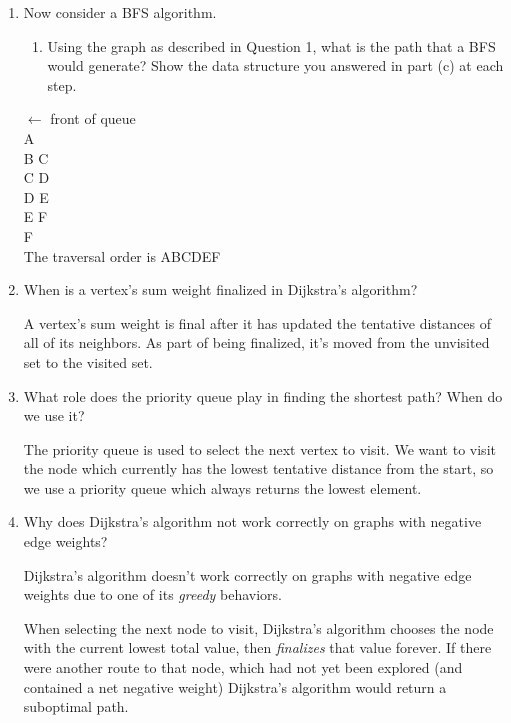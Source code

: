 \documentclass[11pt]{article}
\newenvironment{answer}{\large\lstset{basicstyle=\tiny\ttfamily}\color{white} }{}
\newenvironment{answer}{\large\lstset{basicstyle=\large\ttfamily}\color{red} }{}
\begin{document}
\begin{enumerate}
\item Now consider a BFS algorithm.
\begin{enumerate}
\item Using the graph as described in Question 1, what is the path that a BFS would generate?
Show the data structure you answered in part (c) at each step.
\end{enumerate}
\begin{answer}
$\leftarrow$ front of queue \\
A \\
B C \\
C D \\
D E \\
E F \\
F \\

The traversal order is ABCDEF
\end{answer}


\item When is a vertex's sum weight finalized in Dijkstra's algorithm?

    \begin{answer}
    A vertex's sum weight is final after it has updated the tentative distances
    of all of its neighbors. As part of being finalized, it's moved from the
    unvisited set to the visited set.
    \end{answer}


\item What role does the priority queue play in finding the shortest path?
      When do we use it?

    \begin{answer}
    The priority queue is used to select the next vertex to visit. We want to
    visit the node which currently has the lowest tentative distance from the
    start, so we use a priority queue which always returns the lowest element.
    \end{answer}


\item Why does Dijkstra's algorithm not work correctly on graphs with negative
      edge weights?

\begin{answer}
Dijkstra's algorithm doesn't work correctly on graphs with negative edge
weights due to one of its {\em greedy} behaviors.

When selecting the next node to visit, Dijkstra's algorithm chooses the
node with the current lowest total value, then {\em finalizes} that value
forever. If there were another route to that node, which had not yet been
explored (and contained a net negative weight) Dijkstra's algorithm would
return a suboptimal path.
\end{answer}



\end{enumerate}
\end{document}
